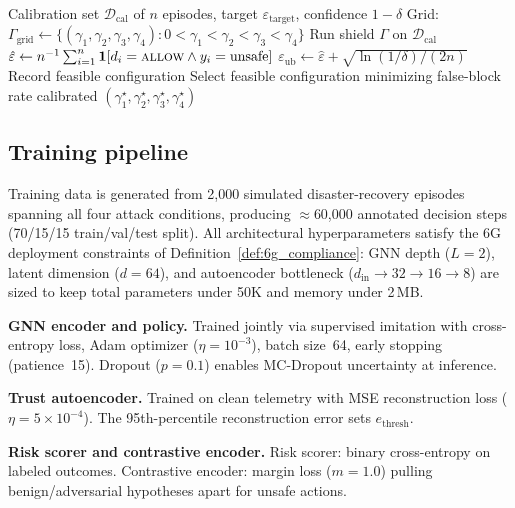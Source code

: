 \documentclass[lettersize,journal]{IEEEtran}
\begin{document}
\begin{algorithm}[t]
\caption{Shield threshold calibration}
\label{alg:calibration}
\begin{algorithmic}[1]
\Require Calibration set $\mathcal{D}_{\mathrm{cal}}$ of $n$ episodes, target $\varepsilon_{\mathrm{target}}$, confidence $1-\delta$
\State Grid: $\Gamma_{\mathrm{grid}} \gets \{(\gamma_1,\gamma_2,\gamma_3,\gamma_4) : 0 < \gamma_1 < \gamma_2 < \gamma_3 < \gamma_4\}$
    \State Run shield $\Gamma$ on $\mathcal{D}_{\mathrm{cal}}$
    \State $\hat{\varepsilon} \gets n^{-1}\sum_{i=1}^{n} \mathbf{1}[d_i = \textsc{allow} \wedge y_i = \text{unsafe}]$
    \State $\varepsilon_{\mathrm{ub}} \gets \hat{\varepsilon} + \sqrt{\ln(1/\delta)/(2n)}$
        \State Record feasible configuration
    \EndIf
\EndFor
\State Select feasible configuration minimizing false-block rate
\State \Return calibrated $(\gamma_1^\star, \gamma_2^\star, \gamma_3^\star, \gamma_4^\star)$
\end{algorithmic}
\end{algorithm}


\subsection{Training pipeline}
\label{sec:training_pipeline}

Training data is generated from 2,000 simulated disaster-recovery episodes spanning all four attack conditions, producing $\approx$60,000 annotated decision steps (70/15/15 train/val/test split).
All architectural hyperparameters satisfy the 6G deployment constraints of Definition~\ref{def:6g_compliance}: GNN depth ($L=2$), latent dimension ($d=64$), and autoencoder bottleneck ($d_{\mathrm{in}} \to 32 \to 16 \to 8$) are sized to keep total parameters under 50K and memory under 2\,MB.

\noindent\textbf{GNN encoder and policy.}
Trained jointly via supervised imitation with cross-entropy loss, Adam optimizer ($\eta=10^{-3}$), batch size~64, early stopping (patience~15).
Dropout ($p=0.1$) enables MC-Dropout uncertainty at inference.

\noindent\textbf{Trust autoencoder.}
Trained on clean telemetry with MSE reconstruction loss ($\eta=5\times10^{-4}$).
The 95th-percentile reconstruction error sets $e_{\mathrm{thresh}}$.

\noindent\textbf{Risk scorer and contrastive encoder.}
Risk scorer: binary cross-entropy on labeled outcomes.
Contrastive encoder: margin loss ($m=1.0$) pulling benign/adversarial hypotheses apart for unsafe actions.
\end{document}
